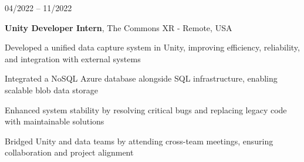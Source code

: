 \begin{twocolentry}{
    04/2022 – 11/2022
}

\fontsize{11 pt}{11 pt}\textbf{Unity Developer Intern}, The Commons XR - Remote, USA\end{twocolentry}

\vspace{0.10 cm}
\begin{onecolentry}
   \begin{highlights}
       \item Developed a unified data capture system in Unity, improving efficiency, reliability, and integration with external systems  
       \item Integrated a NoSQL Azure database alongside SQL infrastructure, enabling scalable blob data storage
       \item Enhanced system stability by resolving critical bugs and replacing legacy code with maintainable solutions
       \item Bridged Unity and data teams by attending cross-team meetings, ensuring collaboration and project alignment
   \end{highlights}
\end{onecolentry}
